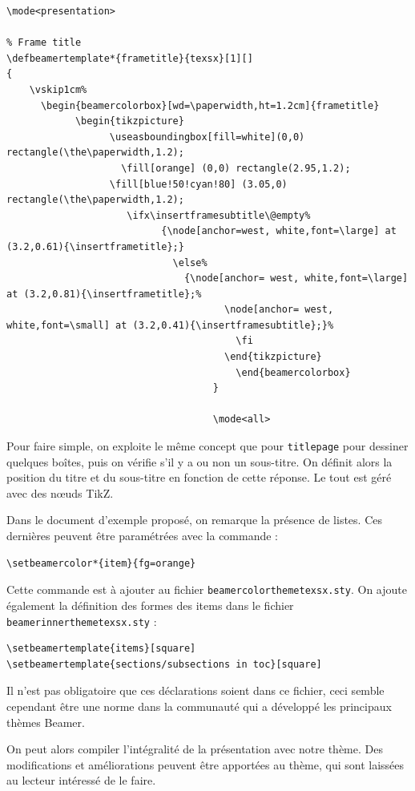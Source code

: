 \begin{lstlisting}[language={[LaTeX]TeX}]
\mode<presentation>

% Frame title
\defbeamertemplate*{frametitle}{texsx}[1][]
{
	\vskip1cm%
	  \begin{beamercolorbox}[wd=\paperwidth,ht=1.2cm]{frametitle} 
		    \begin{tikzpicture}
			      \useasboundingbox[fill=white](0,0) rectangle(\the\paperwidth,1.2);
			        \fill[orange] (0,0) rectangle(2.95,1.2);
				  \fill[blue!50!cyan!80] (3.05,0) rectangle(\the\paperwidth,1.2);
				     \ifx\insertframesubtitle\@empty%
				           {\node[anchor=west, white,font=\large] at (3.2,0.61){\insertframetitle};}
					         \else%
						       {\node[anchor= west, white,font=\large] at (3.2,0.81){\insertframetitle};%
						              \node[anchor= west, white,font=\small] at (3.2,0.41){\insertframesubtitle};}%
							            \fi
								      \end{tikzpicture}
								        \end{beamercolorbox}
									}

									\mode<all>
\end{lstlisting}

Pour faire simple, on exploite le même concept que pour \texttt{titlepage} pour dessiner quelques boîtes, puis on vérifie s'il y a ou non un sous-titre. On définit alors la position du titre et du sous-titre en fonction de cette réponse. Le tout est géré avec des n\oe uds TikZ.

Dans le document d'exemple proposé, on remarque la présence de listes. Ces dernières peuvent être paramétrées avec la commande :

\begin{lstlisting}[language={[LaTeX]TeX}]
\setbeamercolor*{item}{fg=orange}
\end{lstlisting}

Cette commande est à ajouter au fichier \texttt{beamercolorthemetexsx.sty}. On ajoute également la définition des formes des items dans le fichier \texttt{beamerinnerthemetexsx.sty} :

\begin{lstlisting}[language={[LaTeX]TeX}]
% Items
\setbeamertemplate{items}[square]
\setbeamertemplate{sections/subsections in toc}[square]
\end{lstlisting}

Il n'est pas obligatoire que ces déclarations soient dans ce fichier, ceci semble cependant être une norme dans la communauté qui a développé les principaux thèmes Beamer.

On peut alors compiler l'intégralité de la présentation avec notre thème. Des modifications et améliorations peuvent être apportées au thème, qui sont laissées au lecteur intéressé de le faire.

